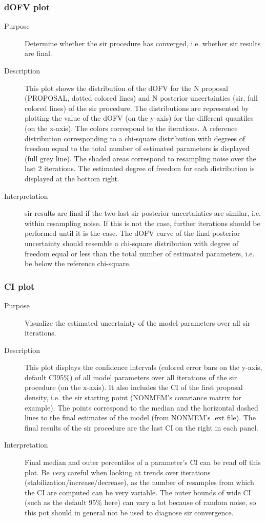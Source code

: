 \subsubsection{dOFV plot}
\begin{description}
\item[Purpose] Determine whether the sir procedure has converged, i.e. whether sir results are final.
\item[Description] This plot shows the distribution of the dOFV for the N proposal (PROPOSAL, dotted colored lines) and N posterior uncertainties (sir, full colored lines) of the sir procedure. The distributions are represented by plotting the value of the dOFV (on the y-axis) for the different quantiles (on the x-axis). The colors correspond to the iterations. A reference distribution corresponding to a chi-square distribution with degrees of freedom equal to the total number of estimated parameters is displayed (full grey line). The shaded areas correspond to resampling noise over the last 2 iterations. The estimated degree of freedom for each distribution is displayed at the bottom right.
\item[Interpretation] sir results are final if the two last sir posterior uncertainties are similar, i.e. within resampling noise. If this is not the case, further iterations should be performed until it is the case. The dOFV curve of the final posterior uncertainty should resemble a chi-square distribution with degree of freedom equal or less than the total number of estimated parameters, i.e. be below the reference chi-square.
\end{description}
\subsubsection{CI plot}
\begin{description}
\item[Purpose] Visualize the estimated uncertainty of the model parameters over all sir iterations.
\item[Description] This plot displays the confidence intervals (colored error bars on the y-axis, default CI95\%)
of all model parameters over all iterations of the sir procedure (on the x-axis). It also includes the CI of the first proposal density, i.e. the sir starting point (NONMEM’s covariance matrix for example). The points correspond to the median and the horizontal dashed lines to the final estimates of the model (from NONMEM’s .ext file). The final results of the sir procedure are the last CI on the right in each panel.
\item[Interpretation] Final median and outer percentiles of a parameter’s CI can be read off this plot. Be \emph{very}
careful when looking at trends over iterations (stabilization/increase/decrease), as the number of resamples from which the CI are computed can be very variable. The outer bounds of wide CI (such as the default 95\% here)
can vary a lot because of random noise, so this pot should in general not be used to diagnose sir convergence.
\end{description}
